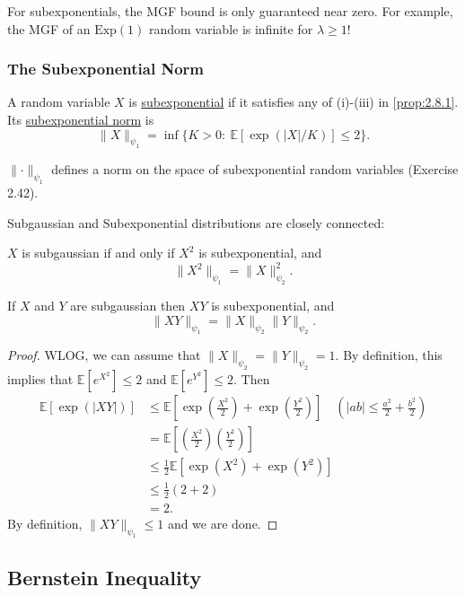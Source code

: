 \begin{remark}
\label{rmk:2.8.3}
For subexponentials, the MGF bound is only guaranteed near zero. For example, the MGF of an $\text{Exp}(1)$ 
random variable is infinite for $\lambda \geq 1$!
\end{remark}


\subsubsection{The Subexponential Norm}
\begin{definition}[]
\label{def:2.8.4}
A random variable $X$ is \underline{subexponential} if it satisfies any of (i)-(iii) in \cref{prop:2.8.1}. 
Its \underline{subexponential norm} is 
\[ \lVert X \rVert_{\psi_1} = \inf\{K > 0: \ \mathbb{E}[\exp{(|X| / K)}] \leq 2\}. \]
\end{definition}
$\lVert \cdot \rVert_{\psi_1}$ defines a norm on the space of subexponential random variables (Exercise 2.42). 

Subgaussian and Subexponential distributions are closely connected: 
\begin{lemma}[]
\label{lem:2.8.5}
$X$ is subgaussian if and only if $X^2$ is subexponential, and 
\[ \lVert X^2 \rVert_{\psi_1} = \lVert X \rVert_{\psi_2}^2. \]
\end{lemma}

\begin{lemma}[Name]
If $X$ and $Y$ are subgaussian then $XY$ is subexponential, and 
\[ \lVert XY \rVert_{\psi_1} = \lVert X \rVert_{\psi_2} \lVert Y \rVert_{\psi_2}. \]
\end{lemma}

\begin{proof}
WLOG, we can assume that $\lVert X \rVert_{\psi_2} = \lVert Y \rVert_{\psi_2} = 1$. By definition, this 
implies that $\mathbb{E}[e^{X^2}] \leq 2$ and $\mathbb{E}[e^{Y^2}] \leq 2$. Then 
\begin{align*}
	\mathbb{E}[\exp{(|XY|)}] 
	&\leq \mathbb{E}\left[ \exp{\left( \frac{X^2}{2} \right)} 
	+ \exp{\left( \frac{Y^2}{2} \right)} \right] \quad (|ab| \leq \frac{a^2}{2} + \frac{b^2}{2}) \\
	&= \mathbb{E}\left[ \left( \frac{X^2}{2} \right) \left( \frac{Y^2}{2} \right) \right] \\
	&\leq \frac{1}{2} \mathbb{E}[\exp{(X^2)} + \exp{(Y^2)}] \\
	&\leq \frac{1}{2}(2 + 2) \\
	&= 2.
\end{align*}
By definition, $\lVert XY \rVert_{\psi_1} \leq 1$ and we are done.
\end{proof}



\subsection{Bernstein Inequality}

